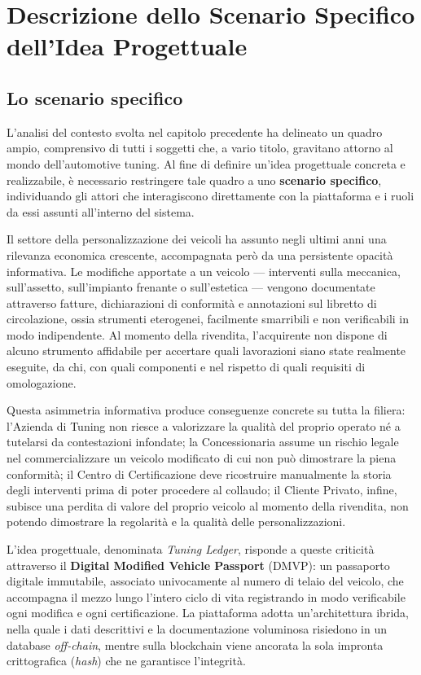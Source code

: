 \chapter{Descrizione dello Scenario Specifico dell'Idea Progettuale}

\section{Lo scenario specifico}

L'analisi del contesto svolta nel capitolo precedente ha delineato un quadro ampio, comprensivo di tutti i soggetti che, a vario titolo, gravitano attorno al mondo dell'automotive tuning. Al fine di definire un'idea progettuale concreta e realizzabile, è necessario restringere tale quadro a uno \textbf{scenario specifico}, individuando gli attori che interagiscono direttamente con la piattaforma e i ruoli da essi assunti all'interno del sistema.

Il settore della personalizzazione dei veicoli ha assunto negli ultimi anni una rilevanza economica crescente, accompagnata però da una persistente opacità informativa. Le modifiche apportate a un veicolo --- interventi sulla meccanica, sull'assetto, sull'impianto frenante o sull'estetica --- vengono documentate attraverso fatture, dichiarazioni di conformità e annotazioni sul libretto di circolazione, ossia strumenti eterogenei, facilmente smarribili e non verificabili in modo indipendente. Al momento della rivendita, l'acquirente non dispone di alcuno strumento affidabile per accertare quali lavorazioni siano state realmente eseguite, da chi, con quali componenti e nel rispetto di quali requisiti di omologazione.

Questa asimmetria informativa produce conseguenze concrete su tutta la filiera: l'Azienda di Tuning non riesce a valorizzare la qualità del proprio operato né a tutelarsi da contestazioni infondate; la Concessionaria assume un rischio legale nel commercializzare un veicolo modificato di cui non può dimostrare la piena conformità; il Centro di Certificazione deve ricostruire manualmente la storia degli interventi prima di poter procedere al collaudo; il Cliente Privato, infine, subisce una perdita di valore del proprio veicolo al momento della rivendita, non potendo dimostrare la regolarità e la qualità delle personalizzazioni.

L'idea progettuale, denominata \textit{Tuning Ledger}, risponde a queste criticità attraverso il \textbf{Digital Modified Vehicle Passport} (DMVP): un passaporto digitale immutabile, associato univocamente al numero di telaio del veicolo, che accompagna il mezzo lungo l'intero ciclo di vita registrando in modo verificabile ogni modifica e ogni certificazione. La piattaforma adotta un'architettura ibrida, nella quale i dati descrittivi e la documentazione voluminosa risiedono in un database \textit{off-chain}, mentre sulla blockchain viene ancorata la sola impronta crittografica (\textit{hash}) che ne garantisce l'integrità.

